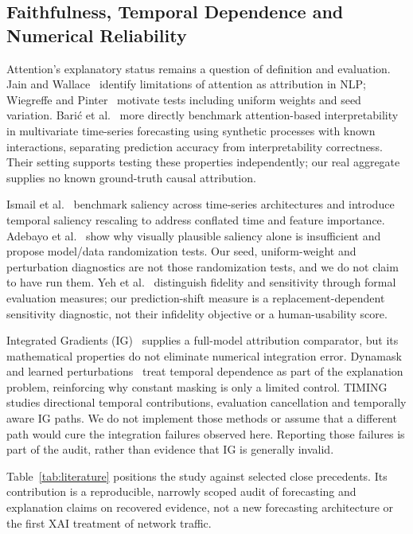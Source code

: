\documentclass[conference]{IEEEtran}
\begin{document}
\subsection{Faithfulness, Temporal Dependence and Numerical Reliability}
Attention's explanatory status remains a question of definition and evaluation. Jain and Wallace~\cite{attention_not} identify limitations of attention as attribution in NLP; Wiegreffe and Pinter~\cite{attention_notnot} motivate tests including uniform weights and seed variation. Bari\'c et al.~\cite{attention_benchmark} more directly benchmark attention-based interpretability in multivariate time-series forecasting using synthetic processes with known interactions, separating prediction accuracy from interpretability correctness. Their setting supports testing these properties independently; our real aggregate supplies no known ground-truth causal attribution.

Ismail et al.~\cite{ts_benchmark} benchmark saliency across time-series architectures and introduce temporal saliency rescaling to address conflated time and feature importance. Adebayo et al.~\cite{sanity} show why visually plausible saliency alone is insufficient and propose model/data randomization tests. Our seed, uniform-weight and perturbation diagnostics are not those randomization tests, and we do not claim to have run them. Yeh et al.~\cite{infidelity} distinguish fidelity and sensitivity through formal evaluation measures; our prediction-shift measure is a replacement-dependent sensitivity diagnostic, not their infidelity objective or a human-usability score.

Integrated Gradients (IG)~\cite{ig} supplies a full-model attribution comparator, but its mathematical properties do not eliminate numerical integration error. Dynamask~\cite{dynamask} and learned perturbations~\cite{learned_perturbations} treat temporal dependence as part of the explanation problem, reinforcing why constant masking is only a limited control. TIMING~\cite{timing} studies directional temporal contributions, evaluation cancellation and temporally aware IG paths. We do not implement those methods or assume that a different path would cure the integration failures observed here. Reporting those failures is part of the audit, rather than evidence that IG is generally invalid.

Table~\ref{tab:literature} positions the study against selected close precedents. Its contribution is a reproducible, narrowly scoped audit of forecasting and explanation claims on recovered evidence, not a new forecasting architecture or the first XAI treatment of network traffic.
\end{document}
